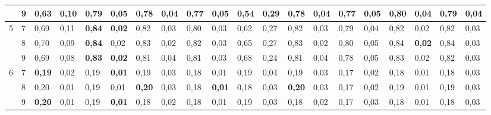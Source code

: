 \documentclass[conference]{IEEEtran}
\begin{document}
\begin{table}[]
\begin{tabular}{|cl|ll|ll|ll|ll|ll|ll|ll|ll|ll|}
		\multicolumn{1}{|c|}{} & 9 & \multicolumn{1}{l|}{0,63} & 0,10 & \multicolumn{1}{l|}{0,79} & 0,05 & \multicolumn{1}{l|}{0,78} & 0,04 & \multicolumn{1}{l|}{0,77} & 0,05 & \multicolumn{1}{l|}{0,54} & 0,29 & \multicolumn{1}{l|}{0,78} & 0,04 & \multicolumn{1}{l|}{0,77} & 0,05 & \multicolumn{1}{l|}{\textbf{0,80}} & 0,04 & \multicolumn{1}{l|}{0,79} & \textbf{0,04} \\ \hline
		\multicolumn{1}{|c|}{\multirow{3}{*}{5}} & 7 & \multicolumn{1}{l|}{0,69} & 0,11 & \multicolumn{1}{l|}{\textbf{0,84}} & \textbf{0,02} & \multicolumn{1}{l|}{0,82} & 0,03 & \multicolumn{1}{l|}{0,80} & 0,03 & \multicolumn{1}{l|}{0,62} & 0,27 & \multicolumn{1}{l|}{0,82} & 0,03 & \multicolumn{1}{l|}{0,79} & 0,04 & \multicolumn{1}{l|}{0,82} & 0,02 & \multicolumn{1}{l|}{0,82} & 0,03 \\ \cline{2-20} 
		\multicolumn{1}{|c|}{} & 8 & \multicolumn{1}{l|}{0,70} & 0,09 & \multicolumn{1}{l|}{\textbf{0,84}} & 0,02 & \multicolumn{1}{l|}{0,83} & 0,02 & \multicolumn{1}{l|}{0,82} & 0,03 & \multicolumn{1}{l|}{0,65} & 0,27 & \multicolumn{1}{l|}{0,83} & 0,02 & \multicolumn{1}{l|}{0,80} & 0,05 & \multicolumn{1}{l|}{0,84} & \textbf{0,02} & \multicolumn{1}{l|}{0,84} & 0,03 \\ \cline{2-20} 
		\multicolumn{1}{|c|}{} & 9 & \multicolumn{1}{l|}{0,69} & 0,08 & \multicolumn{1}{l|}{\textbf{0,83}} & \textbf{0,02} & \multicolumn{1}{l|}{0,81} & 0,04 & \multicolumn{1}{l|}{0,81} & 0,03 & \multicolumn{1}{l|}{0,68} & 0,24 & \multicolumn{1}{l|}{0,81} & 0,04 & \multicolumn{1}{l|}{0,78} & 0,05 & \multicolumn{1}{l|}{0,83} & 0,02 & \multicolumn{1}{l|}{0,82} & 0,03 \\ \hline
		\multicolumn{1}{|c|}{\multirow{3}{*}{6}} & 7 & \multicolumn{1}{l|}{\textbf{0,19}} & 0,02 & \multicolumn{1}{l|}{0,19} & \textbf{0,01} & \multicolumn{1}{l|}{0,19} & 0,03 & \multicolumn{1}{l|}{0,18} & 0,01 & \multicolumn{1}{l|}{0,19} & 0,04 & \multicolumn{1}{l|}{0,19} & 0,03 & \multicolumn{1}{l|}{0,17} & 0,02 & \multicolumn{1}{l|}{0,18} & 0,01 & \multicolumn{1}{l|}{0,18} & 0,03 \\ \cline{2-20} 
		\multicolumn{1}{|c|}{} & 8 & \multicolumn{1}{l|}{0,20} & 0,01 & \multicolumn{1}{l|}{0,19} & 0,01 & \multicolumn{1}{l|}{\textbf{0,20}} & 0,03 & \multicolumn{1}{l|}{0,18} & \textbf{0,01} & \multicolumn{1}{l|}{0,18} & 0,03 & \multicolumn{1}{l|}{\textbf{0,20}} & 0,03 & \multicolumn{1}{l|}{0,17} & 0,02 & \multicolumn{1}{l|}{0,19} & 0,01 & \multicolumn{1}{l|}{0,19} & 0,03 \\ \cline{2-20} 
		\multicolumn{1}{|c|}{} & 9 & \multicolumn{1}{l|}{\textbf{0,20}} & 0,01 & \multicolumn{1}{l|}{0,19} & \textbf{0,01} & \multicolumn{1}{l|}{0,18} & 0,02 & \multicolumn{1}{l|}{0,18} & 0,01 & \multicolumn{1}{l|}{0,19} & 0,03 & \multicolumn{1}{l|}{0,18} & 0,02 & \multicolumn{1}{l|}{0,17} & 0,03 & \multicolumn{1}{l|}{0,18} & 0,01 & \multicolumn{1}{l|}{0,18} & 0,03 \\ \hline

\end{tabular}
\end{table}
\end{document}
